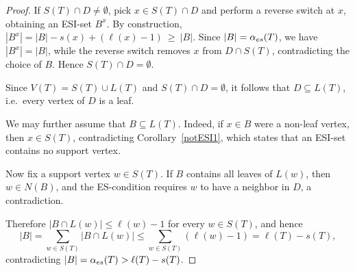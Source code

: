 \documentclass[10pt,a4paper]{amsart}
\newcommand{\es}{\alpha_{\rm es}}
\begin{document}
\begin{proof}
If $S(T)\cap D\neq\emptyset$, pick $x\in S(T)\cap D$ and perform a reverse switch at $x$,
obtaining an ESI-set $B^{x}$. By construction,
$|B^{x}|=|B|-s(x)+(\ell(x)-1)\ \ge\ |B|$. Since $|B|=\es(T)$, we have $|B^{x}|=|B|$, while the reverse
switch removes $x$ from $D\cap S(T)$, contradicting the choice of $B$. Hence
$S(T)\cap D=\emptyset$.

Since $V(T)=S(T)\cup L(T)$ and $S(T)\cap D=\emptyset$, it follows that
$D\subseteq L(T)$, i.e.~every vertex of $D$ is a leaf.

We may further assume that $B\subseteq L(T)$. Indeed, if $x\in B$ were a non-leaf vertex, then $x\in S(T)$,
contradicting Corollary~\ref{notESI1}, which states that an ESI-set contains no support vertex.

Now fix a support vertex $w\in S(T)$. If $B$ contains all leaves of $L(w)$, then $w\in N(B)$,
and the ES-condition requires $w$ to have a neighbor in $D$, a contradiction.

Therefore $|B\cap L(w)|\le \ell(w)-1$ for every $w\in S(T)$, and hence
$$|B|
=\sum_{w\in S(T)}|B\cap L(w)|
\le \sum_{w\in S(T)}(\ell(w)-1)
=\ell(T)-s(T),$$
contradicting $|B|=\es(T)>\ell(T)-s(T)$. 
\end{proof}
\end{document}
